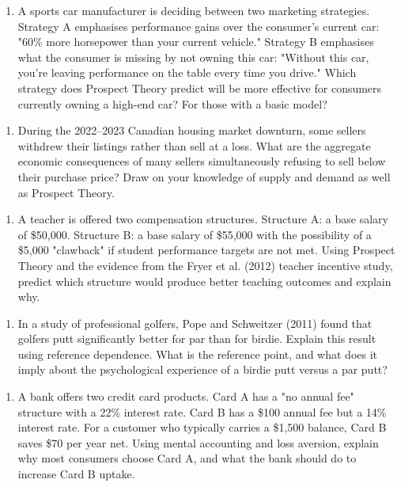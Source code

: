 \documentclass[12pt, letterpaper]{article}
\begin{document}
\begin{enumerate}
\item A sports car manufacturer is deciding between two marketing strategies. Strategy A emphasises performance gains over the consumer's current car: "60\% more horsepower than your current vehicle." Strategy B emphasises what the consumer is missing by not owning this car: "Without this car, you're leaving performance on the table every time you drive." Which strategy does Prospect Theory predict will be more effective for consumers currently owning a high-end car? For those with a basic model?
\end{enumerate}

\begin{enumerate}
\item During the 2022--2023 Canadian housing market downturn, some sellers withdrew their listings rather than sell at a loss. What are the aggregate economic consequences of many sellers simultaneously refusing to sell below their purchase price? Draw on your knowledge of supply and demand as well as Prospect Theory.
\end{enumerate}

\begin{enumerate}
\item A teacher is offered two compensation structures. Structure A: a base salary of \$50,000. Structure B: a base salary of \$55,000 with the possibility of a \$5,000 "clawback" if student performance targets are not met. Using Prospect Theory and the evidence from the Fryer et al. (2012) teacher incentive study, predict which structure would produce better teaching outcomes and explain why.
\end{enumerate}

\begin{enumerate}
\item In a study of professional golfers, Pope and Schweitzer (2011) found that golfers putt significantly better for par than for birdie. Explain this result using reference dependence. What is the reference point, and what does it imply about the psychological experience of a birdie putt versus a par putt?
\end{enumerate}

\begin{enumerate}
\item A bank offers two credit card products. Card A has a "no annual fee" structure with a 22\% interest rate. Card B has a \$100 annual fee but a 14\% interest rate. For a customer who typically carries a \$1,500 balance, Card B saves \$70 per year net. Using mental accounting and loss aversion, explain why most consumers choose Card A, and what the bank should do to increase Card B uptake.
\end{enumerate}
\end{document}
